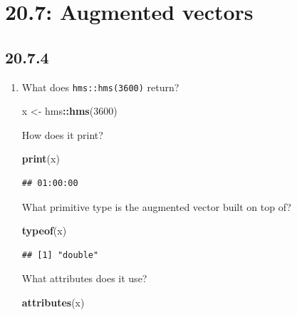 \documentclass[]{book}
\newenvironment{Shaded}{\begin{snugshade}}{\end{snugshade}}
\newcommand{\DecValTok}[1]{\textcolor[rgb]{0.00,0.00,0.81}{#1}}
\newcommand{\KeywordTok}[1]{\textcolor[rgb]{0.13,0.29,0.53}{\textbf{#1}}}
\newcommand{\NormalTok}[1]{#1}
\newcommand{\OperatorTok}[1]{\textcolor[rgb]{0.81,0.36,0.00}{\textbf{#1}}}
\newcommand{\StringTok}[1]{\textcolor[rgb]{0.31,0.60,0.02}{#1}}
\theoremstyle{definition}
\theoremstyle{definition}
\theoremstyle{definition}
\theoremstyle{remark}
\begin{document}
\hypertarget{augmented-vectors}{%
\section{20.7: Augmented vectors}\label{augmented-vectors}}

\hypertarget{section-71}{%
\subsection{20.7.4}\label{section-71}}

\begin{enumerate}
\def\labelenumi{\arabic{enumi}.}
\item
  What does \texttt{hms::hms(3600)} return?

\begin{Shaded}
\begin{Highlighting}[]
\NormalTok{x <-}\StringTok{ }\NormalTok{hms}\OperatorTok{::}\KeywordTok{hms}\NormalTok{(}\DecValTok{3600}\NormalTok{)}
\end{Highlighting}
\end{Shaded}

  How does it print?

\begin{Shaded}
\begin{Highlighting}[]
\KeywordTok{print}\NormalTok{(x)}
\end{Highlighting}
\end{Shaded}

\begin{verbatim}
## 01:00:00
\end{verbatim}

  What primitive type is the augmented vector built on top of?

\begin{Shaded}
\begin{Highlighting}[]
\KeywordTok{typeof}\NormalTok{(x)}
\end{Highlighting}
\end{Shaded}

\begin{verbatim}
## [1] "double"
\end{verbatim}

  What attributes does it use?

\begin{Shaded}
\begin{Highlighting}[]
\KeywordTok{attributes}\NormalTok{(x)}
\end{Highlighting}
\end{Shaded}


\end{enumerate}
\end{document}
